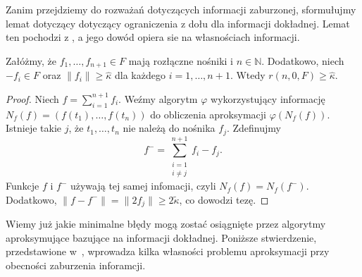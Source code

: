 \documentclass[oik, pdftex, man]{mgrwms}
\begin{document}
    Zanim przejdziemy do rozważań dotyczących informacji zaburzonej, sformułujmy lemat dotyczący dotyczący ograniczenia z dołu dla informacji dokładnej. Lemat ten pochodzi z \cite{DaS}, a jego dowód opiera sie na własnościach informacji.
    \begin{lemma} \label{lem:3}
        Załóżmy, że $f_{1}, \ldots, f_{n+1} \in F$ mają rozłączne nośniki i $n \in \mathbb{N}$. Dodatkowo, niech $-f_{i} \in F$ oraz $\|f_{i}\| \geq \hat{\kappa}$ dla każdego $i=1, \ldots, n+1$. Wtedy $r(n, 0, F) \geq \hat{\kappa}.$
    \end{lemma}
    \begin{proof}
        Niech $f = \sum_{i=1}^{n+1} f_{i}$. Weźmy algorytm $\varphi$ wykorzystujący informację $N_{f}(f) = (f(t_{1}), \ldots, f(t_{n}))$ do obliczenia aproksymacji $\varphi(N_{f}(f))$. Istnieje takie $j$, że $t_{1}, \ldots, t_{n}$ nie należą do nośnika $f_{j}$. Zdefinujmy
        \begin{equation*}
            f^{-} = \sum_{\substack{i = 1 \\ i \neq j}}^{n+1} f_{i} - f_{j}.
        \end{equation*}
        Funkcje $f$ i $f^{-}$ używają tej samej infomacji, czyli $N_{f}(f) = N_{f}(f^{-})$. Dodatkowo, $\|f - f^{-}\|  = \|2f_{j}\| \geq 2 \tilde{\kappa}$, co dowodzi tezę.
    \end{proof}

    Wiemy już jakie minimalne błędy mogą zostać osiągnięte przez algorytmy aproksymujące bazujące na informacji dokładnej. Poniższe stwierdzenie, przedstawione w~\cite{AoP}, wprowadza kilka własności problemu aproksymacji przy obecności zaburzenia inforamcji.
\end{document}
